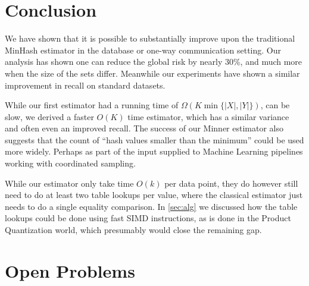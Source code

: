 
\section{Conclusion}

We have shown that it is possible to substantially improve upon the traditional MinHash estimator in the database or one-way communication setting.
Our analysis has shown one can reduce the global risk by nearly 30\%,
and much more when the size of the sets differ.
Meanwhile our experiments have shown a similar improvement in recall on standard datasets.

While our first estimator had a running time of $\Omega(K \min\{|X|,|Y|\})$, can be slow, we derived a faster $O(K)$ time estimator, which has a similar variance and often even an improved recall.
The success of our Minner estimator also suggests that the count of ``hash values smaller than the minimum'' could be used more widely.
Perhaps as part of the input supplied to Machine Learning pipelines working with coordinated sampling.


While our estimator only take time $O(k)$ per data point, they do however still need to do at least two table lookups per value, where the classical estimator just needs to do a single equality comparison.
In \cref{sec:alg} we discussed how the table lookups could be done using fast SIMD instructions, as is done in the Product Quantization world, which presumably would close the remaining gap.

\section{Open Problems}

